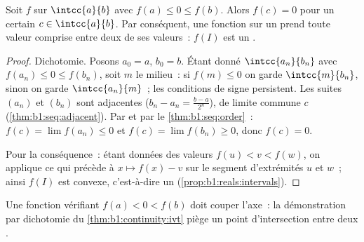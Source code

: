 \begin{theorem}\label{thm:b1:continuity:ivt}
Soit $f$  sur $\intcc{a}{b}$ avec $f(a) \leq 0 \leq
f(b)$. Alors $f(c) = 0$ pour un certain $c \in \intcc{a}{b}$.
Par conséquent, une fonction  sur un  prend toute
valeur comprise entre deux de ses valeurs~: $f(I)$ est un
.
\end{theorem}

\begin{proof}
Dichotomie. Posons $a_0 = a$, $b_0 = b$. Étant donné $\intcc{a_n}{b_n}$
avec $f(a_n) \leq 0 \leq f(b_n)$, soit $m$ le milieu~: si $f(m) \leq
0$ on garde $\intcc{m}{b_n}$, sinon on garde $\intcc{a_n}{m}$~; les
conditions de signe persistent. Les suites $(a_n)$ et $(b_n)$ sont
adjacentes ($b_n - a_n = \frac{b-a}{2^n}$), de limite commune $c$
(\cref{thm:b1:seq:adjacent}). Par  et par le
\cref{thm:b1:seq:order}~: $f(c) = \lim f(a_n) \leq 0$ et $f(c) =
\lim f(b_n) \geq 0$, donc $f(c) = 0$.

Pour la conséquence~: étant données des valeurs $f(u) < v < f(w)$, on
applique ce qui précède à $x \mapsto f(x) - v$ sur le segment
d'extrémités $u$ et $w$~; ainsi $f(I)$ est convexe, c'est-à-dire un
 (\cref{prop:b1:reals:intervals}).
\end{proof}

\begin{omfigure}

{\small Une fonction  vérifiant $f(a) < 0 < f(b)$ doit couper
l'axe~: la démonstration par dichotomie du
\cref{thm:b1:continuity:ivt} piège un point d'intersection entre deux
.}
\end{omfigure}

